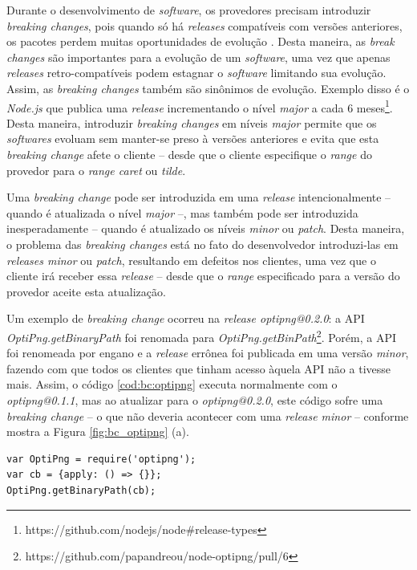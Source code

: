 Durante o desenvolvimento de \textit{software}, os provedores precisam introduzir \textit{breaking changes}, pois quando só há \textit{releases} compatíveis com versões anteriores, os pacotes perdem muitas oportunidades de evolução \cite{teorical_reference:bc_2}. Desta maneira, as \textit{break changes} são importantes para a evolução de um \textit{software}, uma vez que apenas \textit{releases} retro-compatíveis podem estagnar o \textit{software} limitando sua evolução. Assim, as \textit{breaking changes} também são sinônimos de evolução. Exemplo disso é o \textit{Node.js} que publica uma \textit{release} incrementando o nível \textit{major} a cada 6 meses\footnote{https://github.com/nodejs/node\#release-types}. Desta maneira, introduzir \textit{breaking changes} em níveis \textit{major} permite que os \textit{softwares} evoluam sem manter-se preso à versões anteriores e evita que esta \textit{breaking change} afete o cliente -- desde que o cliente especifique o \textit{range} do provedor  para o \textit{range caret} ou \textit{tilde}.

Uma \textit{breaking change} pode ser introduzida em uma \textit{release} intencionalmente -- quando é atualizada o nível \textit{major} --, mas também pode ser introduzida inesperadamente -- quando é atualizado os níveis \textit{minor} ou \textit{patch}. Desta maneira, o problema das \textit{breaking changes} está no fato do desenvolvedor introduzi-las em \textit{releases minor} ou \textit{patch}, resultando em defeitos nos clientes, uma vez que o cliente irá receber essa \textit{release} -- desde que o \textit{range} especificado para a versão do provedor aceite esta atualização.

Um exemplo de \textit{breaking change} ocorreu na \textit{release optipng@0.2.0}: a \gls{API} \textit{OptiPng.getBinaryPath} foi renomada para \textit{OptiPng.getBinPath}\footnote{https://github.com/papandreou/node-optipng/pull/6}. Porém, a \gls{API} foi renomeada por engano e a \textit{release} errônea foi publicada em uma versão \textit{minor}, fazendo com que todos os clientes que tinham acesso àquela \gls{API} não a tivesse mais. Assim, o código \ref{cod:bc:optipng} executa normalmente com o \textit{optipng@0.1.1}, mas ao atualizar para o \textit{optipng@0.2.0}, este código sofre uma \textit{breaking change} -- o que não deveria acontecer com uma \textit{release minor}  -- conforme mostra a Figura \ref{fig:bc_optipng} (a).

\begin{lstlisting}[style=Javascript, label=cod:bc:optipng, caption={Código que sofre \textit{breaking change} do \textit{optipng}}]
var OptiPng = require('optipng');
var cb = {apply: () => {}};
OptiPng.getBinaryPath(cb);
\end{lstlisting}

